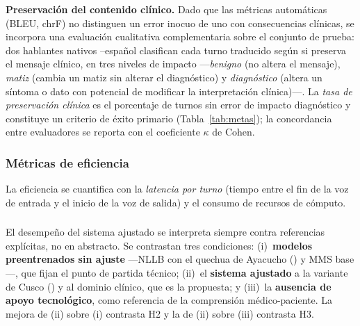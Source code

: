 \begin{bloqueObsCuatro}
\noindent\textbf{Preservaci{\'o}n del contenido cl{\'i}nico.} Dado que las m{\'e}tricas autom{\'a}ticas
(BLEU, chrF) no distinguen un error inocuo de uno con consecuencias cl{\'i}nicas, se incorpora una
evaluaci{\'o}n cualitativa complementaria sobre el conjunto de prueba: dos hablantes nativos
--espa{\~n}ol clasifican cada turno traducido seg{\'u}n si preserva el mensaje cl{\'i}nico,
en tres niveles de impacto ---\emph{benigno} (no altera el mensaje), \emph{matiz} (cambia un matiz
sin alterar el diagn{\'o}stico) y \emph{diagn{\'o}stico} (altera un s{\'i}ntoma o dato con potencial de
modificar la interpretaci{\'o}n cl{\'i}nica)---. La \emph{tasa de preservaci{\'o}n cl{\'i}nica} es el
porcentaje de turnos sin error de impacto diagn{\'o}stico y constituye un criterio de {\'e}xito
primario (Tabla~\ref{tab:metas}); la concordancia entre evaluadores se reporta con el coeficiente
$\kappa$ de Cohen.
\end{bloqueObsCuatro}

\subsubsection{M{\'e}tricas de eficiencia}
La eficiencia se cuantifica con la \emph{latencia por turno} (tiempo entre el fin de la voz de
entrada y el inicio de la voz de salida) y el consumo de recursos de c{\'o}mputo.

\subsubsection{}
\begin{bloqueObsCuatro}
\noindent El desempe{\~n}o del sistema ajustado se interpreta siempre contra referencias expl{\'i}citas,
no en abstracto. Se contrastan tres condiciones: (i)~\textbf{modelos preentrenados sin ajuste}
---NLLB con el quechua de Ayacucho () y MMS base---, que fijan el punto de partida t{\'e}cnico;
(ii)~el \textbf{sistema ajustado} a la variante de Cusco () y al dominio cl{\'i}nico, que es
la propuesta; y (iii)~la \textbf{ausencia de apoyo tecnol{\'o}gico}, como referencia de la
comprensi{\'o}n m{\'e}dico-paciente. La mejora de (ii) sobre (i) contrasta H2 y la de (ii) sobre (iii)
contrasta H3.
\end{bloqueObsCuatro}

